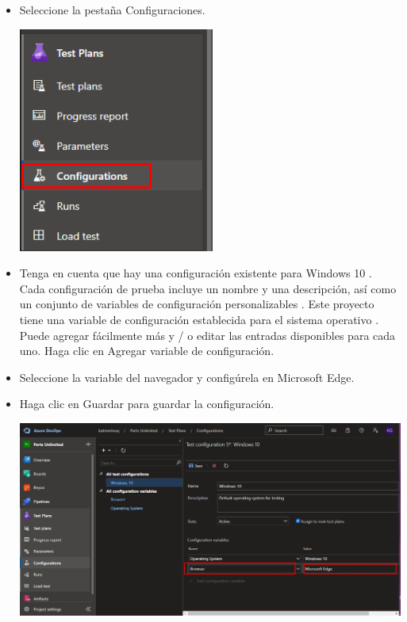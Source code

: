 \begin{itemize}
\item Seleccione la pestaña Configuraciones.
\begin{center}
\includegraphics[width=\columnwidth]{images/42}\newline
\end{center}

\item Tenga en cuenta que hay una configuración existente para Windows 10 . Cada configuración de prueba incluye un nombre y una descripción, así como un conjunto de variables de configuración personalizables . Este proyecto tiene una variable de configuración establecida para el sistema operativo . Puede agregar fácilmente más y / o editar las entradas disponibles para cada uno. Haga clic en Agregar variable de configuración.
\item Seleccione la variable del navegador y configúrela en Microsoft Edge.
\item Haga clic en Guardar para guardar la configuración.
\begin{center}
\includegraphics[width=\columnwidth]{images/10}\newline
\end{center}


\end{itemize}
